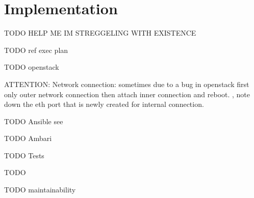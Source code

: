 \chapter{Implementation}
\label{chap:impl}

TODO HELP ME IM STREGGELING WITH EXISTENCE

TODO ref exec plan

TODO openstack

    ATTENTION: Network connection: sometimes due to a bug in openstack first only outer network connection then attach inner connection and reboot. 
    , note down the eth port that is newly created for internal connection.

TODO Ansible
see 

TODO Ambari

TODO Tests


TODO

TODO maintainability
